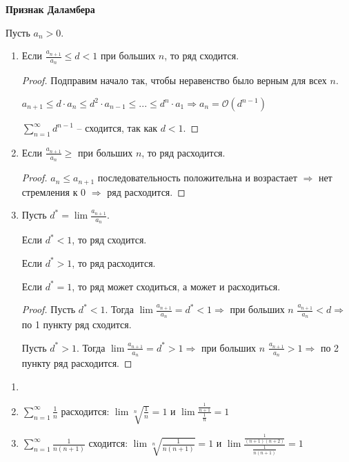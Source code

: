 \begin{theorem}
    \textbf{Признак Даламбера}

    Пусть $a_n> 0$.

    \begin{enumerate}
        \item Если $\frac{a_{n+1}}{a_n}\leq d<1$ при больших $n$, то ряд сходится.
        \begin{proof}
            Подправим начало так, чтобы неравенство было верным для всех $n$.      
            
            $a_{n+1}\leq d\cdot a_n\leq d^2\cdot a_{n-1}\leq...\leq d^n\cdot a_1\Rightarrow a_n=\mathcal{O}(d^{n-1})$

            $\sum\limits_{n=1}^\infty d^{n-1}$ – сходится, так как $d<1$.
        \end{proof}

        \item Если $\frac{a_{n+1}}{a_n}\geq$ при больших $n$, то ряд расходится.

        \begin{proof}
            $a_n\leq a_{n+1}$ последовательность положительна и возрастает $\Rightarrow$ нет стремления к 0 $\Rightarrow$ ряд расходится.
        \end{proof}
        
        \item Пусть $d^*=\lim \frac{a_{n+1}}{a_n}$.

        Если $d^*<1$, то ряд сходится.

        Если $d^*>1$, то ряд расходится.
        
        \begin{remark}
            Если $d^*=1$, то ряд может сходиться, а может и расходиться.
        \end{remark}

        \begin{proof}
            Пусть $d^*<1$. Тогда $\lim \frac{a_{n+1}}{a_n}=d^*<1\Rightarrow$ при больших $n$ $\frac{a_{n+1}}{a_n}<d\Rightarrow$ по 1 пункту ряд сходится.

            Пусть $d^*>1$. Тогда $\lim \frac{a_{n+1}}{a_n}=d^*>1\Rightarrow$ при больших $n$ $\frac{a_{n+1}}{a_n}>1\Rightarrow$ по 2 пункту ряд расходится.
        \end{proof}
    \end{enumerate}
\end{theorem}

\begin{example}
    \begin{enumerate}
        \item[]
        \item $\sum\limits_{n=1}^\infty\frac{1}{n}$ расходится: $\lim \sqrt[n]{\frac{1}{n}}=1$ и $\lim\frac{\frac{1}{n+1}}{\frac{1}{n}}=1$
        \item $\sum\limits_{n=1}^\infty\frac{1}{n(n+1)}$ сходится: $\lim \sqrt[n]{\frac{1}{n(n+1)}}=1$ и $\lim\frac{\frac{1}{(n+1)(n+2)}}{\frac{1}{n(n+1)}}=1$
    \end{enumerate}
\end{example}


